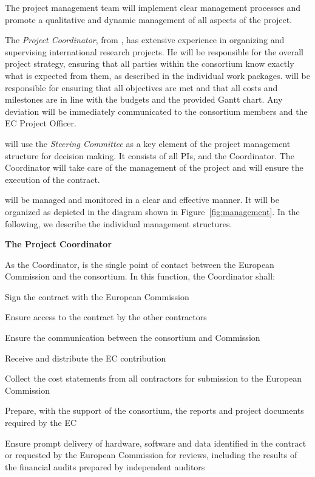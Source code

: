 The project management team will
implement clear management processes and promote a qualitative and
dynamic management of all aspects of the project.

The {\em Project Coordinator}, \Coordinator{} from \COORD, has
extensive experience in organizing and supervising international
research projects. He will be
responsible for the overall project strategy, ensuring that all
parties within the consortium know exactly what is expected from them,
as described in the individual work packages.  \Coordinator{} will be
responsible for ensuring that all objectives are met and that all
costs and milestones are in line with the budgets and the provided
Gantt chart. Any deviation will be immediately communicated to the
consortium members and the EC Project Officer.

\Project{} will use the {\em Steering Committee} as a key element of
the project management structure for decision making. It consists of
all PIs, and the Coordinator. The Coordinator will take care of the management of the
project and will ensure the execution of the contract.

\Project{} will be managed and monitored in a clear and effective
manner. It will be organized as depicted in the diagram shown in
Figure~\ref{fig:management}.  In the following, we describe the
individual management structures.



\vspace{3mm}
{\bf The Project Coordinator}


As the Coordinator, \Coordinator{} is the single point of contact
between the European Commission and the consortium.  In this function,
the Coordinator shall:
\begin{denseItemize}
\item Sign the contract with the European Commission
\item Ensure access to the contract by the other contractors
\item Ensure the communication between the consortium and Commission
\item Receive and distribute the EC contribution
\item Collect the cost statements from all contractors for submission
  to the European Commission
\item Prepare, with the support of the consortium, the reports and
  project documents required by the EC %
\item Ensure prompt delivery of hardware, software and data
  identified in the contract or requested by the European Commission
  for reviews, including the results of the financial audits prepared
  by independent auditors
\end{denseItemize}

